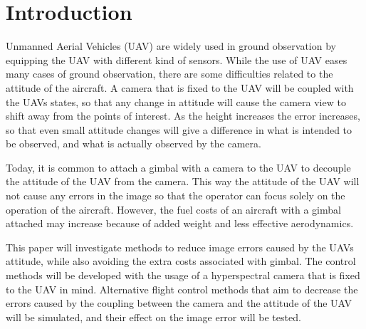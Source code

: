 \section{Introduction}

Unmanned Aerial Vehicles (UAV) are widely used in ground observation by equipping the UAV with different kind of sensors. While the use of UAV eases many cases of ground observation, there are some difficulties related to the attitude of the aircraft. A camera that is fixed to the UAV will be coupled with the UAVs states, so that any change in attitude will cause the camera view to shift away from the points of interest. As the height increases the error increases, so that even small attitude changes will give a difference in what is intended to be observed, and what is actually observed by the camera.

Today, it is common to attach a gimbal with a camera to the UAV to decouple the attitude of the UAV from the camera. This way the attitude of the UAV will not cause any errors in the image so that the operator can focus solely on the operation of the aircraft. However, the fuel costs of an aircraft with a gimbal attached may increase because of added weight and less effective aerodynamics.

This paper will investigate methods to reduce image errors caused by the UAVs attitude, while also avoiding the extra costs associated with gimbal. The control methods will be developed with the usage of a hyperspectral camera that is fixed to the UAV in mind. Alternative flight control methods that aim to decrease the errors caused by the coupling between the camera and the attitude of the UAV will be simulated, and their effect on the image error will be tested.